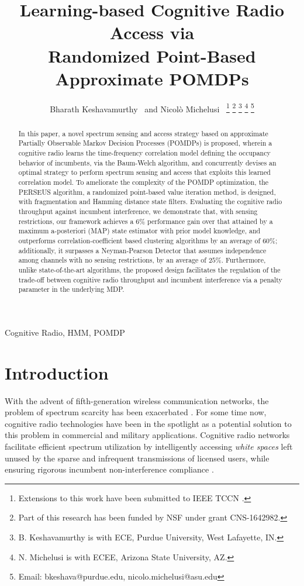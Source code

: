 \documentclass[10pt,twocolumn]{IEEEtran}
\title{Learning-based Cognitive Radio Access via
\\
Randomized Point-Based Approximate POMDPs}
\author{Bharath Keshavamurthy~\IEEEmembership{Student Member, ~IEEE} and Nicol\`{o} Michelusi~\IEEEmembership{Senior Member, ~IEEE}
\thanks{Extensions to this work have been submitted to IEEE TCCN \cite{TCCN:paper}.}
\thanks{Part of this research has been funded by NSF under grant CNS-1642982.}
\thanks{B. Keshavamurthy is with ECE, Purdue University, West Lafayette, IN.}
\thanks{N. Michelusi is with ECEE, Arizona State University, AZ.}
\thanks{Email: bkeshava@purdue.edu, nicolo.michelusi@asu.edu}
\vspace{-12mm}}
\begin{document}
\maketitle
\thispagestyle{empty}
\pagestyle{empty} 
\begin{abstract}
In this paper, a novel spectrum sensing and access strategy based on approximate Partially Observable Markov Decision Processes (POMDPs) is proposed, wherein a cognitive radio learns the time-frequency correlation model defining the occupancy behavior of incumbents, via the Baum-Welch algorithm, and concurrently devises an optimal strategy to perform spectrum sensing and access that exploits this learned correlation model. To ameliorate the complexity of the POMDP optimization, the PERSEUS algorithm, a randomized point-based value iteration method, is designed, with fragmentation and Hamming distance state filters. Evaluating the cognitive radio throughput against incumbent interference, we demonstrate that, with sensing restrictions, our framework achieves a $6$\% performance gain over that attained by a maximum a-posteriori (MAP) state estimator with prior model knowledge, and outperforms correlation-coefficient based clustering algorithms by an average of $60$\%; additionally, it surpasses a Neyman-Pearson Detector that assumes independence among channels with no sensing restrictions, by an average of $25$\%. Furthermore,
 unlike state-of-the-art algorithms,  the proposed design facilitates the regulation of the trade-off between cognitive radio throughput and incumbent interference
 via a penalty parameter in the underlying MDP.
\end{abstract}
\vspace{-3mm}
\begin{IEEEkeywords}
Cognitive Radio, HMM, POMDP
\end{IEEEkeywords}
\vspace{-5.5mm}
\section{Introduction}\label{I}
With the advent of fifth-generation wireless communication networks, the problem of spectrum scarcity has been exacerbated \cite{7158089}. For some time now, cognitive radio technologies have been in the spotlight as a potential solution to this problem in commercial and military applications. Cognitive radio networks facilitate efficient spectrum utilization by intelligently accessing \emph{white spaces} left unused by the sparse and infrequent transmissions of licensed users, while ensuring rigorous incumbent non-interference compliance \cite{4562537}.
\end{document}
